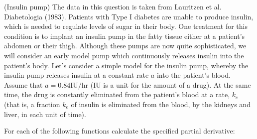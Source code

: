 \documentclass[addpoints, 11pt]{exam}
\begin{document}
\begin{questions}
\question (Insulin pump) The data in this question is taken from Lauritzen et al. Diabetologia (1983). Patients with Type I diabetes are unable to produce insulin, which is needed to regulate levels of sugar in their body. One treatment for this condition is to implant an insulin pump in the fatty tissue either at a patient's abdomen or their thigh. Although these pumps are now quite sophisticated, we will consider an early model pump which continuously releases insulin into the patient's body. Let's consider a simple model for the insulin pump, whereby the insulin pump releases insulin at a constant rate $a$ into the patient's blood. Assume that $a=0.84 \mathrm{IU} / \mathrm{hr}$ (IU is a unit for the amount of a drug). At the same time, the drug is constantly eliminated from the patient's blood at a rate, $k_e$ (that is, a fraction $k_e$ of insulin is eliminated from the blood, by the kidneys and liver, in each unit of time).
\question For each of the following functions calculate the specified partial derivative: \begin{parts}

\end{parts}
\end{questions}
\end{document}
